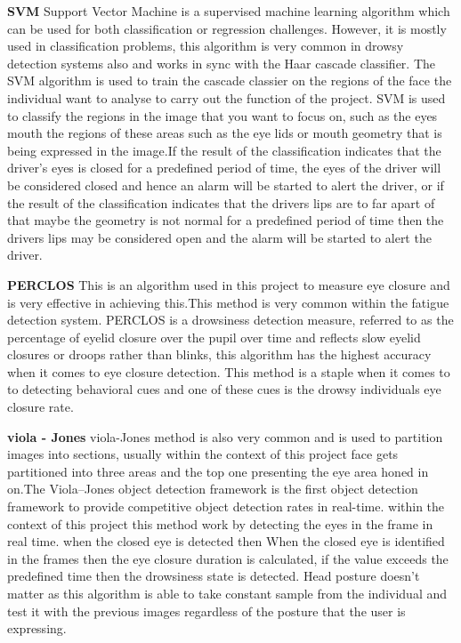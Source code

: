 \textbf{SVM}
Support Vector Machine is a supervised machine learning algorithm which can be used for both classification or regression challenges. However, it is mostly used in classification problems, this algorithm is very common in drowsy detection systems also and works in sync with the Haar cascade classifier. The SVM algorithm is used to train the cascade classier on the regions of the face the individual want to analyse to carry out the function of the  project. SVM is used to classify \cite{Source1}
the regions in the image that you want to focus on, such as the eyes mouth the regions of these areas such as the eye lids or mouth geometry that is being expressed in the image.If the result of the classification indicates that the driver’s eyes is closed for a predefined period of time, the eyes of the driver will be considered closed and hence an alarm will be started to alert the driver, or if the result of the classification indicates that the drivers lips are to far apart of that maybe the geometry is not normal for a  predefined period of time then the drivers lips may be considered open and the alarm will be started to alert the driver.

\textbf{PERCLOS}
This is an algorithm used in this project to measure eye closure and is very effective in achieving this.This method is very common within the fatigue detection system. PERCLOS is a drowsiness detection measure, referred to as the percentage of eyelid closure over the pupil over time and reflects slow eyelid closures or droops rather than blinks\cite{journal}, this algorithm has the highest accuracy when it comes to eye closure detection. This method is a staple when it comes to to detecting behavioral cues and one of these cues is the drowsy individuals eye closure rate.

\textbf{viola - Jones}
viola-Jones method is also very common and is used to partition images into sections, usually within the context of this project face gets partitioned into three areas and the top one presenting the eye area honed in on.The Viola–Jones object detection framework is the first object detection framework to provide competitive object detection rates in real-time. within the context of this project this method work by detecting the eyes in the frame in real time. when the closed eye is detected then When the closed eye is identified in the frames then the eye closure duration is calculated, if the value exceeds the
predefined time then the drowsiness state is detected.\cite{teyeb2014drowsy} Head posture doesn't matter as this algorithm is able to  take constant sample from the individual and test it with the previous images regardless of the posture that the user is expressing.



